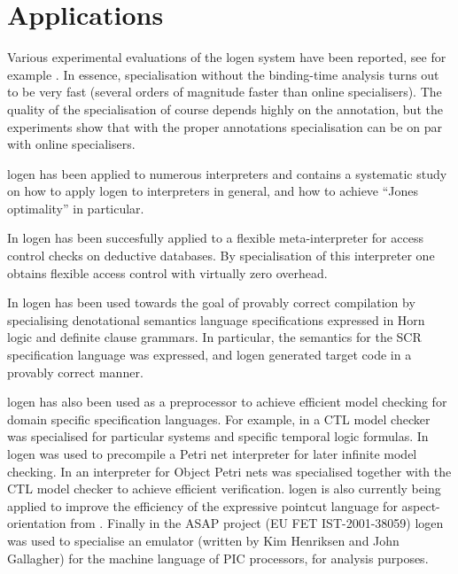 \documentclass{sig-alternate}
\begin{document}
\section{Applications}

Various experimental evaluations of the {\sc logen} system
 have been reported, see for example \cite{LeuschelEtAl:TPLP03}.
In essence, specialisation without the binding-time analysis
  turns out to be very fast (several orders of magnitude faster than
 online specialisers). 
 The quality of the specialisation of course depends highly on
 the annotation, but the experiments show that with the proper annotations 
 specialisation can be on par with online specialisers.

{\sc logen} has been applied to numerous interpreters
 and \cite{Leuschel:lopstrbook} contains a systematic study on
  how to apply {\sc logen} to interpreters in general, and how to
 achieve ``Jones optimality'' in particular.

In  \cite{BarkerLeuschelVarea:pepm04}
 {\sc logen} has been succesfully applied to
 a flexible meta-interpreter for %
access control checks
on deductive data\-bases.
By specialisation of this interpreter one obtains
  flexible access control with virtually zero overhead.


In \cite{WangGuptaLeuschel:PADL05}
{\sc logen} has been used towards the goal of provably correct compilation
 by specialising denotational semantics language specifications expressed in Horn logic
  and definite clause grammars.
In particular, the semantics for the SCR specification language was
 expressed, and {\sc logen} generated target code in a provably correct manner.
 
 {\sc logen} has also been used as a preprocessor to achieve efficient model checking
  for domain specific specification languages.
For example, in \cite{LeuschelMassart:LOPSTR99} a CTL model checker was specialised for
  particular systems and specific temporal logic formulas.
 In \cite{LeuschelLehmann:Coverability,LeuschelLehmann:CL2000}
  {\sc logen} was used to precompile a Petri net interpreter for later infinite model
   checking.
  In 
  \cite{FarwerLeuschel:PPDP04} an interpreter for Object Petri nets was specialised
  together with the CTL model checker to achieve efficient verification.
{\sc logen} is also currently being applied to improve the efficiency
 of the expressive pointcut language for
 aspect-orientation from \cite{Ostermann:ECOOP05}.
Finally in the ASAP project (EU FET IST-2001-38059) 
 {\sc logen} was used to
 specialise an emulator (written by Kim Henriksen and John Gallagher)
 for the machine language of PIC processors, for analysis purposes.
\end{document}
